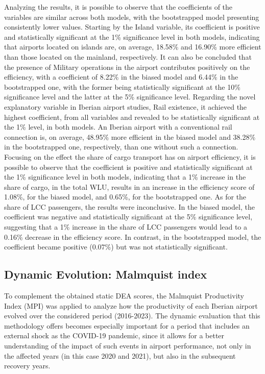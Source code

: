 \vspace{-0.5cm}
Analyzing the results, it is possible to observe that the coefficients of the variables are similar across
both models, with the bootstrapped model presenting consistently lower values. Starting by the Island
variable, its coefficient is positive and statistically significant at the 1\% significance level in both models,
indicating that airports located on islands are, on average, 18.58\% and 16.90\% more efficient than
those located on the mainland, respectively. It can also be concluded that the presence of Military operations in the airport contributes positively
on the efficiency, with a coefficient of 8.22\% in the biased model and 6.44\% in the bootstrapped one, with
the former being statistically significant at the 10\% significance level and the latter at the 5\% significance
level. Regarding the novel explanatory variable in Iberian airport studies, Rail existence, it achieved the
highest coefficient, from all variables and revealed to be statistically significant at the 1\% level, in both
models. An Iberian airport with a conventional rail connection is, on average, 48.95\% more efficient in
the biased model and 38.28\% in the bootstrapped one, respectively, than one without such a connection. Focusing on the effect the share of cargo transport has on airport efficiency, it is possible to observe
that the coefficient is positive and statistically significant at the 1\% significance level in both models,
indicating that a 1\% increase in the share of cargo, in the total WLU, results in an increase in the
efficiency score of 1.08\%, for the biased model, and 0.65\%, for the bootstrapped one. As for the share of LCC passengers, the results were inconclusive. In the biased model, the coefficient was negative and statistically significant at the 5\% significance level, suggesting that a 1\% increase
in the share of LCC passengers would lead to a 0.16\% decrease in the efficiency score. In contrast, in
the bootstrapped model, the coefficient became positive (0.07\%) but was not statistically significant.





\subsection{Dynamic Evolution: Malmquist index}
\label{subsec:resul_malm}
To complement the obtained static DEA scores, the Malmquist Productivity Index
(MPI) was applied to analyze how the productivity of each Iberian airport evolved over the considered
period (2016-2023). The dynamic evaluation that this methodology offers becomes especially important
for a period that includes an external shock as the COVID-19 pandemic, since it allows for a better
understanding of the impact of such events in airport performance, not only in the affected years (in this
case 2020 and 2021), but also in the subsequent recovery years.

